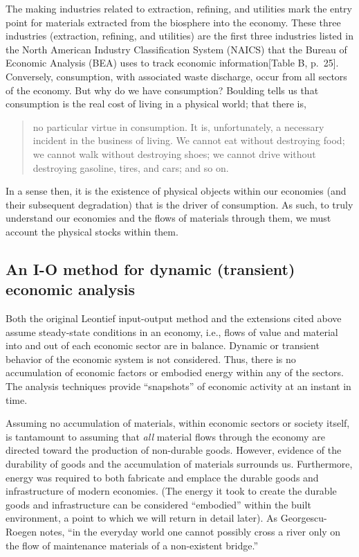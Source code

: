 The making industries related to extraction, 
refining, and utilities mark the entry point for 
materials extracted from the biosphere into the economy. 
These three industries (extraction, refining, and utilities) 
are the first three industries listed in the 
North American Industry Classification System 
(NAICS) that the 
Bureau of Economic Analysis (BEA) uses 
to track economic information[Table B, p.~25].\cite{Lawson2002}
Conversely, consumption, with associated waste
discharge, occur from all sectors of the economy.
But why do we have consumption?
Boulding tells us that consumption is the 
real cost of living in a physical world;
that there is,
\begin{quotation}
no particular virtue in consumption. 
It is, unfortunately, 
a necessary incident in the business of living. 
We cannot eat without destroying food; 
we cannot walk without destroying shoes; 
we cannot drive without destroying gasoline, 
tires, and cars; and so on.\cite[p.2]{Boulding1945}
\end{quotation}
In a sense then,
it is the existence of physical objects within our economies
(and their subsequent degradation)
that is the driver of consumption.
As such,
to truly understand our economies and the 
flows of materials through them,
we must account the physical stocks within them.


\subsection{An I-O method for dynamic (transient) economic analysis}
\label{sec:IO_dynamic}

Both the original Leontief input-output method
and the extensions cited above 
assume steady-state conditions in an economy, 
i.e., flows of value and material into 
and out of each economic sector are in balance. 
Dynamic or transient behavior 
of the economic system is not considered. 
Thus, there is no accumulation of economic factors
or embodied energy
within any of the sectors. 
The analysis techniques provide ``snapshots'' 
of economic activity at an instant in time.

Assuming no accumulation of materials, 
within economic sectors or society itself, 
is tantamount to assuming that \emph{all} material flows 
through the economy are directed toward 
the production of non-durable goods. 
However, evidence of the durability of goods 
and the accumulation of materials surrounds us. 
Furthermore, 
energy was required to both fabricate and emplace 
the durable goods and infrastructure of modern economies. 
(The energy it took to create the durable goods and infrastructure 
can be considered ``embodied'' within the built environment, 
a point to which we will return in detail later). 
As Georgescu-Roegen notes, 
``in the everyday world one cannot possibly cross a river 
only on the flow of maintenance materials 
of a non-existent bridge.''~\cite{G-R1975}


